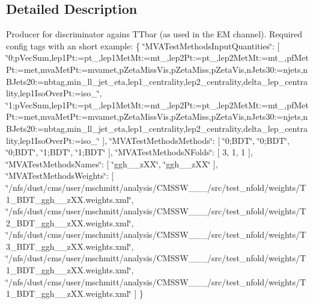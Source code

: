 \subsection{Detailed Description}
Producer for discriminator agains TTbar (as used in the EM channel). Required config tags with an short example: \{ \char`\"{}MVATestMethodsInputQuantities\char`\"{}: \mbox{[} \char`\"{}0;pVecSum,lep1Pt:=pt\_,lep1MetMt:=mt\_,lep2Pt:=pt\_,lep2MetMt:=mt\_,pfMetPt:=met,mvaMetPt:=mvamet,pZetaMissVis,pZetaMiss,pZetaVis,nJets30:=njets,nBJets20:=nbtag,min\_\-ll\_\-jet\_\-eta,lep1\_\-centrality,lep2\_\-centrality,delta\_\-lep\_\-centrality,lep1IsoOverPt:=iso\_\char`\"{}, \char`\"{}1;pVecSum,lep1Pt:=pt\_,lep1MetMt:=mt\_,lep2Pt:=pt\_,lep2MetMt:=mt\_,pfMetPt:=met,mvaMetPt:=mvamet,pZetaMissVis,pZetaMiss,pZetaVis,nJets30:=njets,nBJets20:=nbtag,min\_\-ll\_\-jet\_\-eta,lep1\_\-centrality,lep2\_\-centrality,delta\_\-lep\_\-centrality,lep1IsoOverPt:=iso\_\char`\"{} \mbox{]}, \char`\"{}MVATestMethodsMethods\char`\"{}: \mbox{[} \char`\"{}0;BDT\char`\"{}, \char`\"{}0;BDT\char`\"{}, \char`\"{}0;BDT\char`\"{}, \char`\"{}1;BDT\char`\"{}, \char`\"{}1;BDT\char`\"{} \mbox{]}, \char`\"{}MVATestMethodsNFolds\char`\"{}: \mbox{[} 3, 1, 1 \mbox{]}, \char`\"{}MVATestMethodsNames\char`\"{}: \mbox{[} \char`\"{}ggh\_\_\-zXX\char`\"{}, \char`\"{}ggh\_\_\-zXX\char`\"{} \mbox{]}, \char`\"{}MVATestMethodsWeights\char`\"{}: \mbox{[} \char`\"{}/nfs/dust/cms/user/mschmitt/analysis/CMSSW\_\_\_/src/test\_\-nfold/weights/T1\_\-BDT\_\-ggh\_\_\-zXX.weights.xml\char`\"{}, \char`\"{}/nfs/dust/cms/user/mschmitt/analysis/CMSSW\_\_\_/src/test\_\-nfold/weights/T2\_\-BDT\_\-ggh\_\_\-zXX.weights.xml\char`\"{}, \char`\"{}/nfs/dust/cms/user/mschmitt/analysis/CMSSW\_\_\_/src/test\_\-nfold/weights/T3\_\-BDT\_\-ggh\_\_\-zXX.weights.xml\char`\"{}, \char`\"{}/nfs/dust/cms/user/mschmitt/analysis/CMSSW\_\_\_/src/test\_\-nfold/weights/T1\_\-BDT\_\-ggh\_\_\-zXX.weights.xml\char`\"{}, \char`\"{}/nfs/dust/cms/user/mschmitt/analysis/CMSSW\_\_\_/src/test\_\-nfold/weights/T1\_\-BDT\_\-ggh\_\_\-zXX.weights.xml\char`\"{} \mbox{]} \}

